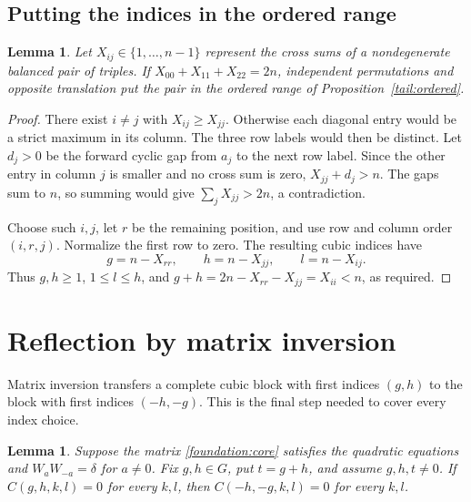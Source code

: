 \documentclass[11pt]{article}
\numberwithin{equation}{section}
\newtheorem{lemma}[theorem]{Lemma}
\theoremstyle{definition}
\theoremstyle{remark}
\begin{document}
\subsection{Putting the indices in the ordered range}

\begin{lemma}\label{tail:normalform}
Let $X_{ij}\in\{1,\ldots,n-1\}$ represent the cross sums of a
nondegenerate balanced pair of triples. If
$X_{00}+X_{11}+X_{22}=2n$, independent permutations and opposite
translation put the pair in the ordered range of
Proposition~\ref{tail:ordered}.
\end{lemma}

\begin{proof}
There exist $i\ne j$ with $X_{ij}\ge X_{jj}$.  Otherwise
each diagonal entry would be a strict maximum in its column.
The three row labels would then be distinct.  Let $d_j>0$
be the forward cyclic gap from $a_j$ to the next row label.
Since the other entry in column $j$ is smaller and no cross
sum is zero, $X_{jj}+d_j>n$.  The gaps sum to $n$, so summing
would give $\sum_jX_{jj}>2n$, a contradiction.

Choose such $i,j$, let $r$ be the remaining position, and use
row and column order $(i,r,j)$.  Normalize the first row to
zero.  The resulting cubic indices have
\[
 g=n-X_{rr},\qquad h=n-X_{jj},\qquad l=n-X_{ij}.
\]
Thus $g,h\ge1$, $1\le l\le h$, and
$g+h=2n-X_{rr}-X_{jj}=X_{ii}<n$, as required.
\end{proof}

\section{Reflection by matrix inversion}
\label{sec:reflection}

Matrix inversion transfers a complete cubic block with first indices
$(g,h)$ to the block with first indices $(-h,-g)$. This is the final
step needed to cover every index choice.

\begin{lemma}\label{allodd:reflection}
Suppose the matrix \eqref{foundation:core} satisfies the quadratic equations
and $W_aW_{-a}=\delta$ for $a\ne0$.  Fix $g,h\in G$, put $t=g+h$, and assume $g,h,t\ne0$.  If $C(g,h,k,l)=0$ for every $k,l$, then
$C(-h,-g,k,l)=0$ for every $k,l$.
\end{lemma}
\end{document}
